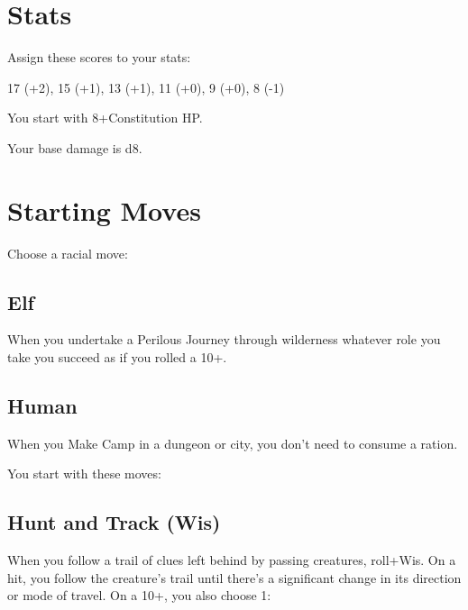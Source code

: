  
\section{Stats}   
 



Assign these scores to your stats:

 

17 (+2), 15 (+1), 13 (+1), 11 (+0), 9 (+0), 8 (-1)

 

You start with 8+Constitution HP.



 

Your base damage is d8.

 
\section{Starting Moves}   
 


\startInstructionsAfterHeader
Choose a racial move:
\stopInstructionsAfterHeader
 


\subsection{Elf}   
 

When you undertake a Perilous Journey through wilderness whatever role you take you succeed as if you rolled a 10+.

 
\subsection{Human}   
 

When you Make Camp in a dungeon or city, you don't need to consume a ration.



 


\startInstructions
You start with these moves:
\stopInstructions
 
\subsection{Hunt and Track (Wis)}     
 

When you follow a trail of clues left behind by passing creatures, roll+Wis. On a hit, you follow the creature's trail until there's a significant change in its direction or mode of travel. On a 10+, you also choose 1:

